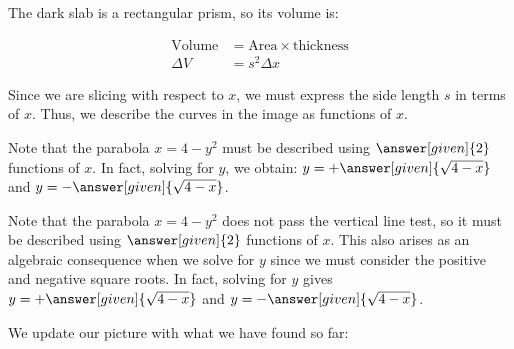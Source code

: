 \documentclass{ximera}
\begin{document}
\begin{model}
The dark slab is a rectangular prism, so its volume is:

\begin{align*}
\textrm{Volume} &= \textrm{Area} \times \textrm{thickness} \\
\Delta V &= s^2 \Delta x
\end{align*}

Since we are slicing with respect to $x$, we must express the side length $s$ in terms of $x$.  Thus, we describe the curves in the image as functions of $x$.  


Note that the parabola $x=4-y^2$ must be described using $\answer[given]{2}$ functions of $x$.  In fact, solving for $y$, we obtain: $y=+\answer[given]{\sqrt{4-x}}$ and $y=-\answer[given]{\sqrt{4-x}}$.

Note that the parabola $x=4-y^2$ does not pass the vertical line test, so it must be described using $\answer[given]{2}$ functions of $x$.  This also arises as an algebraic consequence when we solve for $y$ since we must consider the positive and negative square roots.  In fact, solving for $y$ gives $y=+\answer[given]{\sqrt{4-x}}$ and $y=-\answer[given]{\sqrt{4-x}}$.

We update our picture with what we have found so far:

\begin{image}
\end{image}
\end{model}
\end{document}
